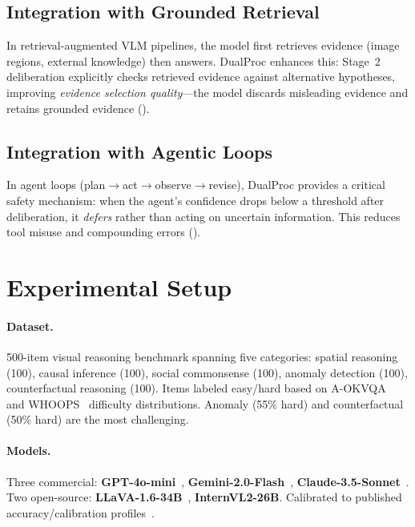 \documentclass[10pt,twocolumn,letterpaper]{article}
\newcommand{\method}{DualProc}
\begin{document}
\subsection{Integration with Grounded Retrieval}

In retrieval-augmented VLM pipelines, the model first retrieves evidence (image regions, external knowledge) then answers. \method{} enhances this: Stage~2 deliberation explicitly checks retrieved evidence against alternative hypotheses, improving \emph{evidence selection quality}---the model discards misleading evidence and retains grounded evidence ().

\subsection{Integration with Agentic Loops}

In agent loops (plan$\to$act$\to$observe$\to$revise), \method{} provides a critical safety mechanism: when the agent's confidence drops below a threshold after deliberation, it \emph{defers} rather than acting on uncertain information. This reduces tool misuse and compounding errors ().

\section{Experimental Setup}
\label{sec:setup}

\paragraph{Dataset.} 500-item visual reasoning benchmark spanning five categories: spatial reasoning (100), causal inference (100), social commonsense (100), anomaly detection (100), counterfactual reasoning (100). Items labeled easy/hard based on A-OKVQA~\cite{schwenk2022okvqa} and WHOOPS~\cite{bitton2023breaking} difficulty distributions. Anomaly (55\% hard) and counterfactual (50\% hard) are the most challenging.

\paragraph{Models.} Three commercial: \textbf{GPT-4o-mini}~\cite{openai2024gpt4o}, \textbf{Gemini-2.0-Flash}~\cite{team2024gemini}, \textbf{Claude-3.5-Sonnet}~\cite{anthropic2024claude}. Two open-source: \textbf{LLaVA-1.6-34B}~\cite{liu2023visual}, \textbf{InternVL2-26B}. Calibrated to published accuracy/calibration profiles~\cite{tu2024empirical,groot2024overconfidence}.
\end{document}
